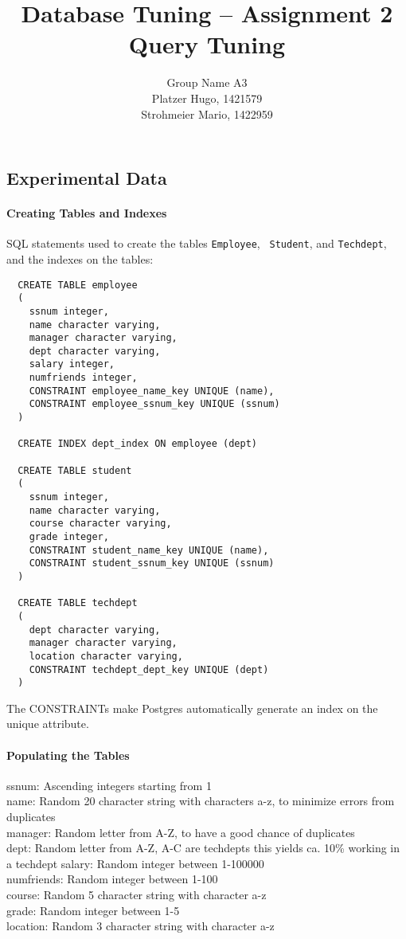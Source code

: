 \documentclass[11pt]{scrartcl}
\title{
  \textbf{\large Database Tuning -- Assignment 2}\\
  Query Tuning
}
\author{
 Group Name A3\\
 \large Platzer Hugo, 1421579 \\
 \large Strohmeier Mario, 1422959
}
\begin{document}
\maketitle

\subsection*{Experimental Data}

\paragraph{Creating Tables and Indexes}

SQL statements used to create the tables {\tt Employee}, {\tt
  Student}, and {\tt Techdept}, and the indexes on the tables:

{\small
\begin{verbatim}
  CREATE TABLE employee
  (
    ssnum integer,
    name character varying,
    manager character varying,
    dept character varying,
    salary integer,
    numfriends integer,
    CONSTRAINT employee_name_key UNIQUE (name),
    CONSTRAINT employee_ssnum_key UNIQUE (ssnum)
  )

  CREATE INDEX dept_index ON employee (dept)

  CREATE TABLE student
  (
    ssnum integer,
    name character varying,
    course character varying,
    grade integer,
    CONSTRAINT student_name_key UNIQUE (name),
    CONSTRAINT student_ssnum_key UNIQUE (ssnum)
  )

  CREATE TABLE techdept
  (
    dept character varying,
    manager character varying,
    location character varying,
    CONSTRAINT techdept_dept_key UNIQUE (dept)
  )
\end{verbatim}
}

The CONSTRAINTs make Postgres automatically generate an index on the
unique attribute.

\paragraph{Populating the Tables}

ssnum: Ascending integers starting from 1\\
name: Random 20 character string with characters a-z, to minimize errors from duplicates\\
manager: Random letter from A-Z, to have a good chance of duplicates\\
dept: Random letter from A-Z, A-C are techdepts
this yields ca. 10\% working in a techdept
salary: Random integer between 1-100000\\
numfriends: Random integer between 1-100\\
course: Random 5 character string with character a-z\\
grade: Random integer between 1-5\\
location: Random 3 character string with character a-z\\
\end{document}
